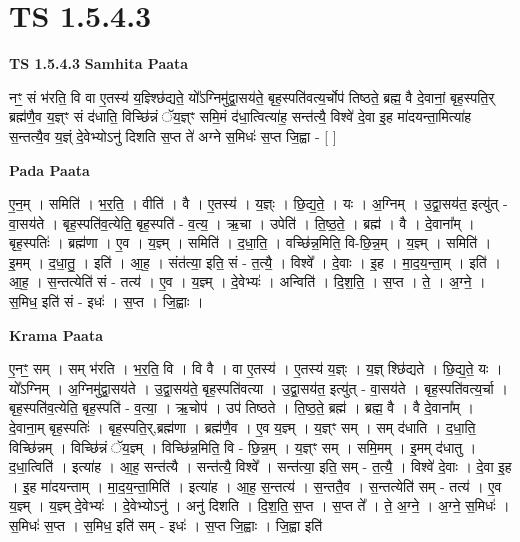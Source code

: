 \documentclass[17pt]{extarticle}
\begin{document}
\section{ TS 1.5.4.3 }

\textbf{TS 1.5.4.3 } \newline
\textbf{Samhita Paata} \newline

नꣳ॒॒ सं भ॑रति॒ वि वा ए॒तस्य॑ य॒ज्ञ्श्छि॑द्यते॒ यो᳚ऽग्निमु॑द्वा॒सय॑ते॒ बृह॒स्पति॑वत्य॒र्चोप॑ तिष्ठते॒ ब्रह्म॒ वै दे॒वानां॒ बृह॒स्पति॒र् ब्रह्म॑णै॒व य॒ज्ञ्ꣳ सं द॑धाति॒ विच्छि॑न्नं ॅय॒ज्ञ्ꣳ समि॒मं द॑धा॒त्वित्या॑ह॒ सन्त॑त्यै॒ विश्वे॑ दे॒वा इ॒ह मा॑दयन्ता॒मित्या॑ह स॒न्तत्यै॒व य॒ज्ञ्ं दे॒वेभ्योऽनु॑ दिशति स॒प्त ते॑ अग्ने स॒मिधः॑ स॒प्त जि॒ह्वा - [ ] \newline

\textbf{Pada Paata} \newline

ए॒न॒म् । समिति॑ । भ॒र॒ति॒ । वीति॑ । वै । ए॒तस्य॑ । य॒ज्ञ्ः । छि॒द्य॒ते॒ । यः । अ॒ग्निम् । उ॒द्वा॒सय॑त॒ इत्यु॑त् - वा॒सय॑ते । बृह॒स्पति॑व॒त्येति॒॒ बृह॒स्पति॑ - व॒त्य॒ । ऋ॒चा । उपेति॑ । ति॒ष्ठ॒ते॒ । ब्रह्म॑ । वै । दे॒वाना᳚म् । बृह॒स्पतिः॑ । ब्रह्म॑णा । ए॒व । य॒ज्ञ्म् । समिति॑ । द॒धा॒ति॒ । वच्छि॑न्न॒मिति॒ वि-छि॒न्न॒म् । य॒ज्ञ्म् । समिति॑ । इ॒मम् । द॒धा॒तु॒ । इति॑ । आ॒ह॒ । संत॑त्या॒ इति॒ सं - त॒त्यै॒ । विश्वे᳚ । दे॒वाः । इ॒ह । मा॒द॒य॒न्ता॒म् । इति॑ । आ॒ह॒ । स॒न्तत्येति॑ सं - तत्य॑ । ए॒व । य॒ज्ञ्म् । दे॒वेभ्यः॑ । अन्विति॑ । दि॒श॒ति॒ । स॒प्त । ते॒ । अ॒ग्ने॒ । स॒मिध॒ इति॑ सं - इधः॑ । स॒प्त । जि॒ह्वाः ।  \newline


\textbf{Krama Paata} \newline

ए॒नꣳ॒॒ सम् । सम् भ॑रति । भ॒र॒ति॒ वि । वि वै । वा ए॒तस्य॑ । ए॒तस्य॑ य॒ज्ञ्ः । य॒ज्ञ् श्छि॑द्यते । छि॒द्य॒ते॒ यः । यो᳚ऽग्निम् । अ॒ग्निमु॑द्वा॒सय॑ते । उ॒द्वा॒सय॑ते॒ बृह॒स्पति॑वत्या । उ॒द्वा॒सय॑त॒ इत्यु॑त् - वा॒सय॑ते । बृह॒स्पति॑वत्य॒र्चा । बृह॒स्पति॑व॒त्येति॒ बृह॒स्पति॑ - व॒त्या॒ । ऋ॒चोप॑ । उप॑ तिष्ठते । ति॒ष्ठ॒ते॒ ब्रह्म॑ । ब्रह्म॒ वै । वै दे॒वाना᳚म् । दे॒वाना॒म् बृह॒स्पतिः॑ । बृह॒स्पति॒र्,ब्रह्म॑णा । ब्रह्म॑णै॒व । ए॒व य॒ज्ञ्म् । य॒ज्ञ्ꣳ सम् । सम् द॑धाति । द॒धा॒ति॒ विच्छि॑न्नम् । विच्छि॑न्नं ॅय॒ज्ञ्म् । विच्छि॑न्न॒मिति॒ वि - छि॒न्न॒म् । य॒ज्ञ्ꣳ सम् । समि॒मम् । इ॒मम् द॑धातु । द॒धा॒त्विति॑ । इत्या॑ह । आ॒ह॒ सन्त॑त्यै । सन्त॑त्यै॒ विश्वे᳚ । सन्त॑त्या॒ इति॒ सम् - त॒त्यै॒ । विश्वे॑ दे॒वाः । दे॒वा इ॒ह । इ॒ह मा॑दयन्ताम् । मा॒द॒य॒न्ता॒मिति॑ । इत्या॑ह । आ॒ह॒ स॒न्तत्य॑ । स॒न्ततै॒व । स॒न्तत्येति॑ सम् - तत्य॑ । ए॒व य॒ज्ञ्म् । य॒ज्ञ्म् दे॒वेभ्यः॑ । दे॒वेभ्योऽनु॑ । अनु॑ दिशति । दि॒श॒ति॒ स॒प्त । स॒प्त ते᳚ । ते॒ अ॒ग्ने॒ । अ॒ग्ने॒ स॒मिधः॑ । स॒मिधः॑ स॒प्त । स॒मिध॒ इति॑ सम् - इधः॑ । स॒प्त जि॒ह्वाः । जि॒ह्वा इति॑ \newline
\end{document}
